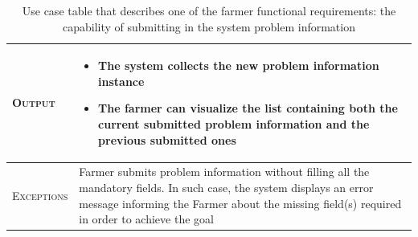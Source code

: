 \begin{table}[H]
\begin{tabular}{|l|p{}|}
    	\textsc{Output}             &  \begin{itemize}
    	    \item The system collects the new problem information instance
    	    \item The farmer can visualize the list containing both the current submitted problem information and the previous submitted ones
    	\end{itemize}\\
    	\hline %
    	\textsc{Exceptions}         &   Farmer submits problem information without filling all the mandatory fields. In such case, the system displays an error message informing the Farmer about the missing field(s) required in order to achieve the goal\\
    	\hline %
        
    \end{tabular}

\caption{\label{tab:problem_information}Use case table that describes one of the farmer functional requirements: the capability of submitting in the system problem information}
\end{table}


